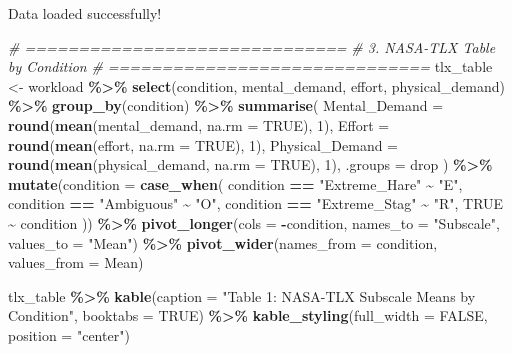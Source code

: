 \documentclass[
]{article}
\newenvironment{Shaded}{\begin{snugshade}}{\end{snugshade}}
\newcommand{\AttributeTok}[1]{\textcolor[rgb]{0.13,0.29,0.53}{#1}}
\newcommand{\CommentTok}[1]{\textcolor[rgb]{0.56,0.35,0.01}{\textit{#1}}}
\newcommand{\ConstantTok}[1]{\textcolor[rgb]{0.56,0.35,0.01}{#1}}
\newcommand{\DecValTok}[1]{\textcolor[rgb]{0.00,0.00,0.81}{#1}}
\newcommand{\FunctionTok}[1]{\textcolor[rgb]{0.13,0.29,0.53}{\textbf{#1}}}
\newcommand{\NormalTok}[1]{#1}
\newcommand{\OtherTok}[1]{\textcolor[rgb]{0.56,0.35,0.01}{#1}}
\newcommand{\SpecialCharTok}[1]{\textcolor[rgb]{0.81,0.36,0.00}{\textbf{#1}}}
\newcommand{\StringTok}[1]{\textcolor[rgb]{0.31,0.60,0.02}{#1}}
\begin{document}
Data loaded successfully!

\begin{Shaded}
\begin{Highlighting}[]
\CommentTok{\# ==============================}
\CommentTok{\# 3. NASA{-}TLX Table by Condition}
\CommentTok{\# ==============================}
\NormalTok{tlx\_table }\OtherTok{\textless{}{-}}\NormalTok{ workload }\SpecialCharTok{\%\textgreater{}\%}
  \FunctionTok{select}\NormalTok{(condition, mental\_demand, effort, physical\_demand) }\SpecialCharTok{\%\textgreater{}\%}
  \FunctionTok{group\_by}\NormalTok{(condition) }\SpecialCharTok{\%\textgreater{}\%}
  \FunctionTok{summarise}\NormalTok{(}
    \AttributeTok{Mental\_Demand =} \FunctionTok{round}\NormalTok{(}\FunctionTok{mean}\NormalTok{(mental\_demand, }\AttributeTok{na.rm =} \ConstantTok{TRUE}\NormalTok{), }\DecValTok{1}\NormalTok{),}
    \AttributeTok{Effort        =} \FunctionTok{round}\NormalTok{(}\FunctionTok{mean}\NormalTok{(effort, }\AttributeTok{na.rm =} \ConstantTok{TRUE}\NormalTok{), }\DecValTok{1}\NormalTok{),}
    \AttributeTok{Physical\_Demand =} \FunctionTok{round}\NormalTok{(}\FunctionTok{mean}\NormalTok{(physical\_demand, }\AttributeTok{na.rm =} \ConstantTok{TRUE}\NormalTok{), }\DecValTok{1}\NormalTok{),}
    \AttributeTok{.groups =} \StringTok{\textquotesingle{}drop\textquotesingle{}}
\NormalTok{  ) }\SpecialCharTok{\%\textgreater{}\%}
  \FunctionTok{mutate}\NormalTok{(}\AttributeTok{condition =} \FunctionTok{case\_when}\NormalTok{(}
\NormalTok{    condition }\SpecialCharTok{==} \StringTok{"Extreme\_Hare"}  \SpecialCharTok{\textasciitilde{}} \StringTok{"E"}\NormalTok{,}
\NormalTok{    condition }\SpecialCharTok{==} \StringTok{"Ambiguous"}     \SpecialCharTok{\textasciitilde{}} \StringTok{"O"}\NormalTok{,}
\NormalTok{    condition }\SpecialCharTok{==} \StringTok{"Extreme\_Stag"}  \SpecialCharTok{\textasciitilde{}} \StringTok{"R"}\NormalTok{,}
    \ConstantTok{TRUE} \SpecialCharTok{\textasciitilde{}}\NormalTok{ condition}
\NormalTok{  )) }\SpecialCharTok{\%\textgreater{}\%}
  \FunctionTok{pivot\_longer}\NormalTok{(}\AttributeTok{cols =} \SpecialCharTok{{-}}\NormalTok{condition, }\AttributeTok{names\_to =} \StringTok{"Subscale"}\NormalTok{, }\AttributeTok{values\_to =} \StringTok{"Mean"}\NormalTok{) }\SpecialCharTok{\%\textgreater{}\%}
  \FunctionTok{pivot\_wider}\NormalTok{(}\AttributeTok{names\_from =}\NormalTok{ condition, }\AttributeTok{values\_from =}\NormalTok{ Mean)}

\NormalTok{tlx\_table }\SpecialCharTok{\%\textgreater{}\%}
  \FunctionTok{kable}\NormalTok{(}\AttributeTok{caption =} \StringTok{"Table 1: NASA{-}TLX Subscale Means by Condition"}\NormalTok{, }\AttributeTok{booktabs =} \ConstantTok{TRUE}\NormalTok{) }\SpecialCharTok{\%\textgreater{}\%}
  \FunctionTok{kable\_styling}\NormalTok{(}\AttributeTok{full\_width =} \ConstantTok{FALSE}\NormalTok{, }\AttributeTok{position =} \StringTok{"center"}\NormalTok{)}
\end{Highlighting}
\end{Shaded}
\end{document}
